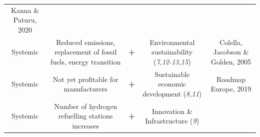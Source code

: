 \documentclass[
]{book}
\begin{document}
\begin{longtable}[]{@{}ccccc@{}}
\begin{minipage}[t]{0.17\columnwidth}
Kanna \& Paturu, 2020\strut
\end{minipage}\tabularnewline
\begin{minipage}[t]{0.17\columnwidth}\centering
Systemic\strut
\end{minipage} & \begin{minipage}[t]{0.16\columnwidth}\centering
Reduced emissions, replacement of fossil fuels, energy transition\strut
\end{minipage} & \begin{minipage}[t]{0.17\columnwidth}\centering
\textbf{+}\strut
\end{minipage} & \begin{minipage}[t]{0.17\columnwidth}\centering
Environmental sustainability (\emph{7,12-13,15})\strut
\end{minipage} & \begin{minipage}[t]{0.17\columnwidth}\centering
Colella, Jacobson \& Golden, 2005\strut
\end{minipage}\tabularnewline
\begin{minipage}[t]{0.17\columnwidth}\centering
Systemic\strut
\end{minipage} & \begin{minipage}[t]{0.16\columnwidth}\centering
Not yet profitable for manufacturers\strut
\end{minipage} & \begin{minipage}[t]{0.17\columnwidth}\centering
\textbf{+}\strut
\end{minipage} & \begin{minipage}[t]{0.17\columnwidth}\centering
Sustainable economic development (\emph{8,11})\strut
\end{minipage} & \begin{minipage}[t]{0.17\columnwidth}\centering
Roadmap Europe, 2019\strut
\end{minipage}\tabularnewline
\begin{minipage}[t]{0.17\columnwidth}\centering
Systemic\strut
\end{minipage} & \begin{minipage}[t]{0.16\columnwidth}\centering
Number of hydrogen refuelling stations increases\strut
\end{minipage} & \begin{minipage}[t]{0.17\columnwidth}\centering
\textbf{+}\strut
\end{minipage} & \begin{minipage}[t]{0.17\columnwidth}\centering
Innovation \& Infrastructure (\emph{9})\strut
\end{minipage} & \begin{minipage}[t]{0.17\columnwidth}\centering

\end{minipage}
\end{longtable}
\end{document}
